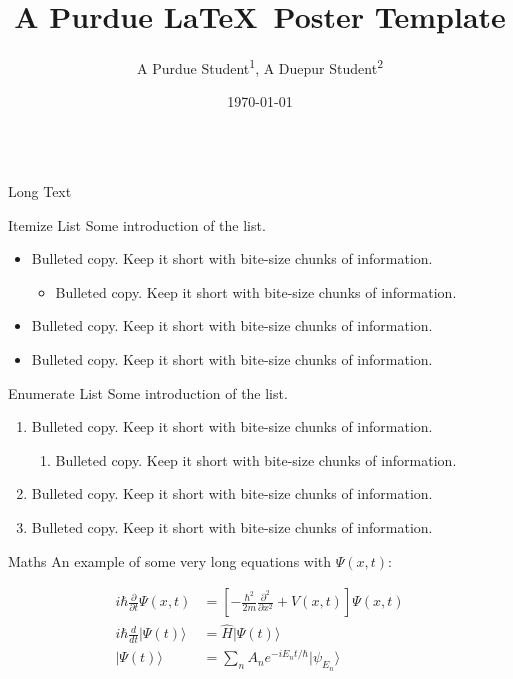 \documentclass{purdue-poster}
\title{\Huge{A Purdue \LaTeX\ Poster Template}}
\author{\Large{A Purdue Student\texorpdfstring{\textsuperscript{1}}{}, A Duepur Student\texorpdfstring{\textsuperscript{2}}{}}}
\institute
{\large{Purdue University\texorpdfstring{\textsuperscript{1}}{}, Duepur University\texorpdfstring{\textsuperscript{2}},\\
Appearing at Overleaf Template}}
\date{\today}
\begin{document}
\begin{frame}{}
    \begin{columns}[c]
    \begin{column}{.48\linewidth}
    \begin{block}{\large Long Text}
        \bigskip

        \lipsum[2]
    \end{block}

    \begin{block}{Itemize List}
        Some introduction of the list.
        \begin{itemize}
            \item Bulleted copy. Keep it short with bite-size chunks of information.
            \begin{itemize}
                \item Bulleted copy. Keep it short with bite-size chunks of information.
            \end{itemize}
            \item Bulleted copy. Keep it short with bite-size chunks of information.
            \item Bulleted copy. Keep it short with bite-size chunks of information.
        \end{itemize}
    \end{block}

    \begin{block}{Enumerate List}
        Some introduction of the list.
        \begin{enumerate}
            \item Bulleted copy. Keep it short with bite-size chunks of information.
            \begin{enumerate}
                \item Bulleted copy. Keep it short with bite-size chunks of information.
            \end{enumerate}
            \item Bulleted copy. Keep it short with bite-size chunks of information.
            \item Bulleted copy. Keep it short with bite-size chunks of information.
        \end{enumerate}
    \end{block}

    \begin{block}{Maths}
        An example of some very long equations with $\Psi (x,t)$:
        
        \begin{align}
        i\hbar {\frac {\partial }{\partial t}}\Psi (x,t)&=\left[-{\frac {\hbar ^{2}}{2m}}{\frac {\partial ^{2}}{\partial x^{2}}}+V(x,t)\right]\Psi (x,t) \\
        i\hbar {\frac {d}{dt}}\vert \Psi (t)\rangle &={\hat {H}}\vert \Psi (t)\rangle \\ 
        |\Psi (t)\rangle &=\sum _{n}A_{n}e^{{-iE_{n}t}/\hbar }|\psi _{E_{n}}\rangle
        \end{align}
        

\end{block}
\end{column}
\end{columns}
\end{frame}
\end{document}
